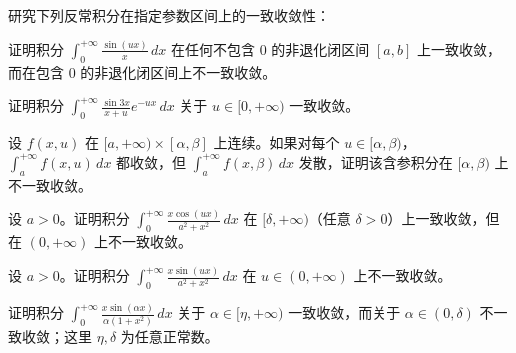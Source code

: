 \noindent\begin{minipage}{\textwidth}
研究下列反常积分在指定参数区间上的一致收敛性：
\end{minipage}\par\vfill
\noindent\begin{minipage}{\textwidth}
证明积分 $\displaystyle\int_0^{+\infty}\frac{\sin(ux)}x\,dx$ 在任何不包含 $0$ 的非退化闭区间 $[a,b]$ 上一致收敛，而在包含 $0$ 的非退化闭区间上不一致收敛。
\end{minipage}\par\vfill
\newpage
\noindent\begin{minipage}{\textwidth}
证明积分 $\displaystyle\int_0^{+\infty}\frac{\sin3x}{x+u}e^{-ux}\,dx$ 关于 $u\in[0,+\infty)$ 一致收敛。
\end{minipage}\par\vfill
\noindent\begin{minipage}{\textwidth}
设 $f(x,u)$ 在 $[a,+\infty)\times[\alpha,\beta]$ 上连续。如果对每个 $u\in[\alpha,\beta)$，$\int_a^{+\infty}f(x,u)\,dx$ 都收敛，但 $\int_a^{+\infty}f(x,\beta)\,dx$ 发散，证明该含参积分在 $[\alpha,\beta)$ 上不一致收敛。
\end{minipage}\par\vfill
\noindent\begin{minipage}{\textwidth}
设 $a>0$。证明积分 $\displaystyle\int_0^{+\infty}\frac{x\cos(ux)}{a^2+x^2}\,dx$ 在 $[\delta,+\infty)$（任意 $\delta>0$）上一致收敛，但在 $(0,+\infty)$ 上不一致收敛。
\end{minipage}\par\vfill
\newpage
\noindent\begin{minipage}{\textwidth}
设 $a>0$。证明积分 $\displaystyle\int_0^{+\infty}\frac{x\sin(ux)}{a^2+x^2}\,dx$ 在 $u\in(0,+\infty)$ 上不一致收敛。
\end{minipage}\par\vfill
\noindent\begin{minipage}{\textwidth}
证明积分 $\displaystyle\int_0^{+\infty}\frac{x\sin(\alpha x)}{\alpha(1+x^2)}\,dx$ 关于 $\alpha\in[\eta,+\infty)$ 一致收敛，而关于 $\alpha\in(0,\delta)$ 不一致收敛；这里 $\eta,\delta$ 为任意正常数。
\end{minipage}\par\vfill
